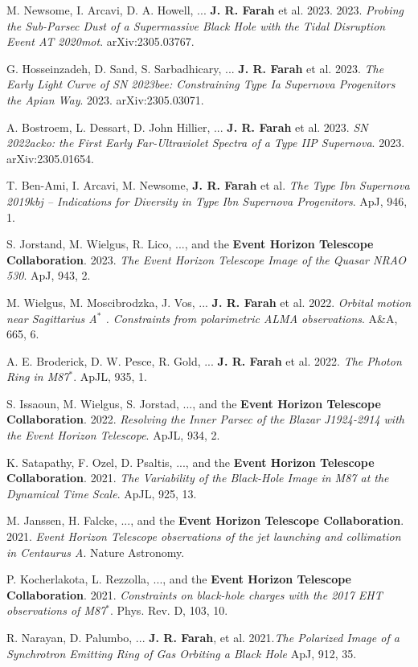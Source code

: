 \documentclass[margin,line]{res}
\begin{document}
\begin{resume}
M. Newsome, I. Arcavi, D. A. Howell, ... \textbf{J. R. Farah} et al. 2023. 2023.  \textit{Probing the Sub-Parsec Dust of a Supermassive Black Hole with the Tidal Disruption Event AT 2020mot}. arXiv:2305.03767.

G. Hosseinzadeh, D. Sand, S. Sarbadhicary, ... \textbf{J. R. Farah} et al. 2023. \textit{The Early Light Curve of SN 2023bee: Constraining Type Ia Supernova Progenitors the Apian Way}. 2023. arXiv:2305.03071. 

A. Bostroem, L. Dessart,  D. John Hillier, ... \textbf{J. R. Farah} et al. 2023. \textit{SN 2022acko: the First Early Far-Ultraviolet Spectra of a Type IIP Supernova}. 2023. arXiv:2305.01654.

T. Ben-Ami, I. Arcavi, M. Newsome, \textbf{J. R. Farah} et al. \textit{The Type Ibn Supernova 2019kbj -- Indications for Diversity in Type Ibn Supernova Progenitors}. ApJ, 946, 1.

S. Jorstand, M. Wielgus, R. Lico, ..., and the \textbf{Event Horizon Telescope Collaboration}. 2023. \textit{The Event Horizon Telescope Image of the Quasar NRAO 530}. ApJ, 943, 2.
 
M. Wielgus, M. Moscibrodzka, J. Vos, ... \textbf{J. R. Farah} et al. 2022. \textit{Orbital motion near Sagittarius A$^\ast$ . Constraints from polarimetric ALMA observations}. A\&A, 665, 6.

A. E. Broderick, D. W. Pesce, R. Gold, ... \textbf{J. R. Farah} et al. 2022. \textit{The Photon Ring in M87$^\ast$}. ApJL, 935, 1.

S. Issaoun, M. Wielgus, S. Jorstad, ..., and the \textbf{Event Horizon Telescope Collaboration}. 2022. \textit{Resolving the Inner Parsec of the Blazar J1924-2914 with the Event Horizon Telescope}. ApJL, 934, 2.

K. Satapathy, F. Ozel, D. Psaltis, ..., and the \textbf{Event Horizon Telescope Collaboration}. 2021. \textit{The Variability of the Black-Hole Image in M87 at the Dynamical Time Scale}. ApJL, 925, 13.


M. Janssen, H. Falcke, ..., and the \textbf{Event Horizon Telescope Collaboration}. 2021. \textit{Event Horizon Telescope observations of the jet launching and collimation in Centaurus A}. Nature Astronomy.

P. Kocherlakota, L. Rezzolla, ..., and the \textbf{Event Horizon Telescope Collaboration}. 2021. \textit{Constraints on black-hole charges with the 2017 EHT observations of M87$^\ast$}. Phys. Rev. D, 103, 10.

R. Narayan, D. Palumbo, ... \textbf{J. R. Farah}, et al. 2021.\textit{The Polarized Image of a Synchrotron Emitting Ring of Gas Orbiting a Black Hole} ApJ, 912, 35.


\end{resume}
\end{document}
